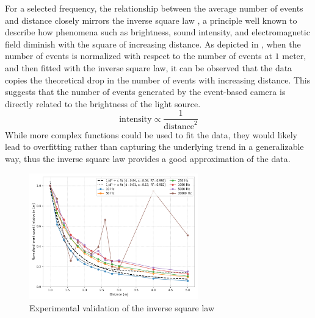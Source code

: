 For a selected frequency, the relationship between the average number of events and distance closely mirrors the inverse square
law , a principle well known to describe how phenomena such as brightness, sound intensity, and electromagnetic field
diminish with the square of increasing distance.
As depicted in , when the number of events is normalized with respect to the number of events at $1$ meter, and then fitted with
the inverse square law, it can be observed that the data copies the theoretical drop in the number of events with increasing distance.
This suggests that the number of events generated by the event-based camera is directly related to the brightness of the light source.
\begin{equation}
    \text{intensity} \propto \frac{1}{\text{distance}^2}
    \label{eq:inv_square_law}
\end{equation}
While more complex functions could be used to fit the data, they would likely lead to overfitting rather than capturing the underlying trend in a generalizable way, thus the inverse square law provides a good approximation of the data.
\begin{figure}[H]
	\centering
	\includegraphics[width=0.65\textwidth]{./fig/pgfplot/build/inv_square.pdf}
	\caption{Experimental validation of the inverse square law}
	\label{fig:fit1}
\end{figure}

